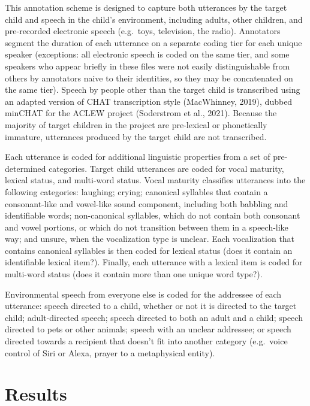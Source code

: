 \documentclass[
  man,floatsintext]{apa6}
\begin{document}
This annotation scheme is designed to capture both utterances by the target child and speech in the child's environment, including adults, other children, and pre-recorded electronic speech (e.g.~toys, television, the radio). Annotators segment the duration of each utterance on a separate coding tier for each unique speaker (exceptions: all electronic speech is coded on the same tier, and some speakers who appear briefly in these files were not easily distinguishable from others by annotators naive to their identities, so they may be concatenated on the same tier). Speech by people other than the target child is transcribed using an adapted version of CHAT transcription style (MacWhinney, 2019), dubbed minCHAT for the ACLEW project (Soderstrom et al., 2021). Because the majority of target children in the project are pre-lexical or phonetically immature, utterances produced by the target child are not transcribed.

Each utterance is coded for additional linguistic properties from a set of pre-determined categories. Target child utterances are coded for vocal maturity, lexical status, and multi-word status. Vocal maturity classifies utterances into the following categories: laughing; crying; canonical syllables that contain a consonant-like and vowel-like sound component, including both babbling and identifiable words; non-canonical syllables, which do not contain both consonant and vowel portions, or which do not transition between them in a speech-like way; and unsure, when the vocalization type is unclear. Each vocalization that contains canonical syllables is then coded for lexical status (does it contain an identifiable lexical item?). Finally, each utterance with a lexical item is coded for multi-word status (does it contain more than one unique word type?).

Environmental speech from everyone else is coded for the addressee of each utterance: speech directed to a child, whether or not it is directed to the target child; adult-directed speech; speech directed to both an adult and a child; speech directed to pets or other animals; speech with an unclear addressee; or speech directed towards a recipient that doesn't fit into another category (e.g.~voice control of Siri or Alexa, prayer to a metaphysical entity).

\hypertarget{results}{%
\section{Results}\label{results}}
\end{document}
